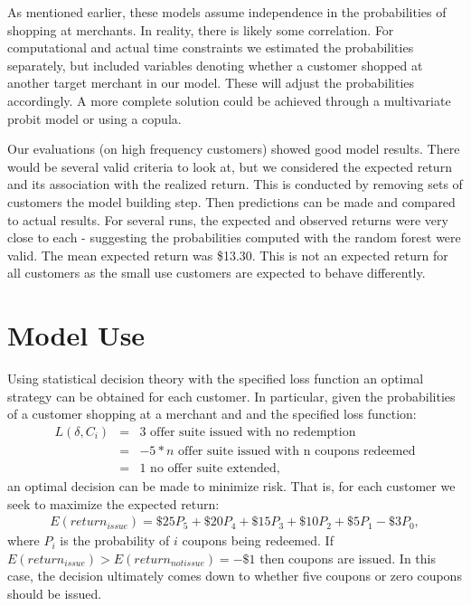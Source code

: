 \documentclass[12pt]{article} %
\begin{document}
As mentioned earlier, these models assume independence in the probabilities of shopping at merchants.  In reality, there is likely some correlation.  For computational and actual time constraints we estimated the probabilities separately, but included variables denoting whether a customer shopped at another target merchant in our model.  These will adjust the probabilities accordingly.  A more complete solution could be achieved through a multivariate probit model or using a copula.

Our evaluations (on high frequency customers) showed good model results.  There would be several valid criteria to look at, but we considered the expected return and its association with the realized return.  This is conducted by removing sets of customers the model building step.  Then predictions can be made and compared to actual results.  For several runs, the expected and observed returns were very close to each - suggesting the probabilities computed with the random forest were valid.  The mean expected return was \$13.30.  This is not an expected return for all customers as the small use customers are expected to behave differently.
 
\section{Model Use}
Using statistical decision theory with the specified loss function an optimal strategy can be obtained for each customer.
In particular, given the probabilities of a customer shopping at a merchant and and the specified loss function:  
\begin{eqnarray*}
L(\delta,C_i) &=& 3 \text {  offer suite issued with no redemption}\\
&=& -5 * n \text{  offer suite issued with n coupons redeemed}\\
&=& 1 \text{  no offer suite extended},
\end{eqnarray*}
an optimal decision can be made to minimize risk.  That is, for each customer we seek to maximize the expected return:
\begin{eqnarray}
E(return_{issue}) = \$25 P_5 + \$20 P_4 + \$15 P_3 +\$10 P_2 +\$5 P_1 - \$3 P_0,
\end{eqnarray}
where $P_i$ is the probability of $i$ coupons being redeemed.  If $E(return_{issue}) > E(return_{notissue}) =-\$1$ then coupons are issued.  In this case, the decision ultimately comes down to whether five coupons or zero coupons should be issued.
\end{document}
